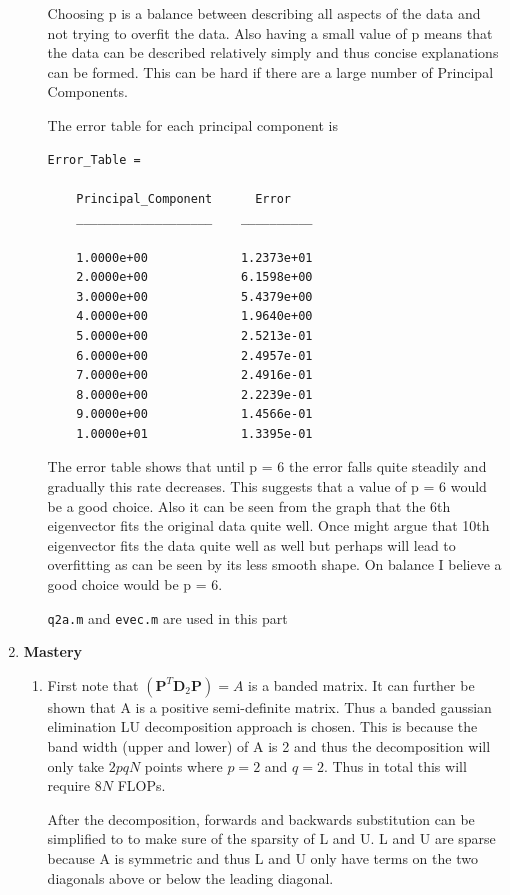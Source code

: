 \documentclass{article}
\begin{document}
\begin{enumerate}
\begin{enumerate}
			Choosing p is a balance between describing all aspects of the data and not trying to overfit the data. Also having a small value of p means that the data can be described relatively simply and thus concise explanations can be formed. This can be hard if there are a large number of Principal Components. 
			
			The error table for each principal component is
			
			\begin{verbatim}
Error_Table = 

    Principal_Component      Error   
    ___________________    __________

    1.0000e+00             1.2373e+01
    2.0000e+00             6.1598e+00
    3.0000e+00             5.4379e+00
    4.0000e+00             1.9640e+00
    5.0000e+00             2.5213e-01
    6.0000e+00             2.4957e-01
    7.0000e+00             2.4916e-01
    8.0000e+00             2.2239e-01
    9.0000e+00             1.4566e-01
    1.0000e+01             1.3395e-01
			\end{verbatim}
			
			The error table shows that until p = 6 the error falls quite steadily and gradually this rate decreases. This suggests that a value of p = 6 would be a good choice. Also it can be seen from the graph that the 6th eigenvector fits the original data quite well. Once might argue that 10th eigenvector fits the data quite well as well but perhaps will lead to overfitting as can be seen by its less smooth shape. On balance I believe a good choice would be p = 6.
			  		
			\texttt{q2a.m} and \texttt{evec.m} are used in this part			
		\end{enumerate}

	\item \textbf{Mastery}
	\begin{enumerate}
		\item First note that $ (\textbf{P}^T \textbf{D}_2 \textbf{P}) = A $ is a banded matrix. It can further be shown that A is a positive semi-definite matrix. Thus a banded gaussian elimination LU decomposition approach is chosen. This is because the band width (upper and lower) of A is 2 and thus the decomposition will only take $2pqN$ points where $p = 2$ and $q = 2$. Thus in total this will require $8N$ FLOPs. 
		 
			After the decomposition, forwards and backwards substitution can be simplified to to make sure of the sparsity of L and U. L and U are sparse because A is symmetric and thus L and U only have terms on the two diagonals above or below the leading diagonal. 
			

\end{enumerate}
\end{enumerate}
\end{document}
